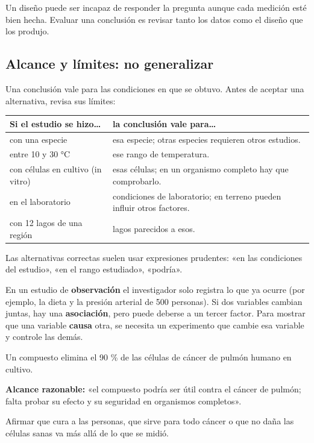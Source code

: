 \begin{clave}[{Recuerda}] Un diseño puede ser incapaz de responder la pregunta aunque cada medición esté bien hecha. Evaluar una conclusión es revisar tanto los datos como el diseño que los produjo.\end{clave}
\subsection{Alcance y límites: no generalizar}
Una conclusión vale para las condiciones en que se obtuvo. Antes de aceptar una alternativa, revisa sus límites:

 
\begin{center}\small
\begin{tabularx}{\linewidth}{@{}>{\raggedright\arraybackslash\hsize=0.90\hsize}X>{\raggedright\arraybackslash\hsize=1.10\hsize}X@{}}
\toprule
\textbf{Si el estudio se hizo\dots{}} & \textbf{la conclusión vale para\dots{}} \\
\midrule
con una especie & esa especie; otras especies requieren otros estudios. \\
entre 10 y 30 °C & ese rango de temperatura. \\
con células en cultivo (in vitro) & esas células; en un organismo completo hay que comprobarlo. \\
en el laboratorio & condiciones de laboratorio; en terreno pueden influir otros factores. \\
con 12 lagos de una región & lagos parecidos a esos. \\
\bottomrule
\end{tabularx}
\end{center}
 

Las alternativas correctas suelen usar expresiones prudentes: «en las condiciones del estudio», «en el rango estudiado», «podría».

  
\begin{clave} En un estudio de \textbf{observación} el investigador solo registra lo que ya ocurre (por ejemplo, la dieta y la presión arterial de 500 personas). Si dos variables cambian juntas, hay una \textbf{asociación}, pero puede deberse a un tercer factor. Para mostrar que una variable \textbf{causa} otra, se necesita un experimento que cambie esa variable y controle las demás.\end{clave}
 
\begin{ejemplo} Un compuesto elimina el 90 \% de las células de cáncer de pulmón humano en cultivo.\par \textbf{Alcance razonable:} «el compuesto podría ser útil contra el cáncer de pulmón; falta probar su efecto y su seguridad en organismos completos».\par Afirmar que cura a las personas, que sirve para todo cáncer o que no daña las células sanas va más allá de lo que se midió.\end{ejemplo}
